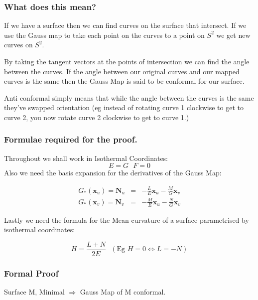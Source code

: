 \subsubsection{What does this mean?}
If we have a surface then we can find curves on the surface that intersect. If we use the Gauss map to take each point on the curves to a point on $S^2$ we get new curves on $S^2$.

By taking the tangent vectors at the points of intersection we can find the angle between the curves. If the angle between our original curves and our mapped curves is the same then the Gauss Map is said to be conformal for our surface.

Anti conformal simply means that while the angle between the curves is the same they've swapped orientation (eg instead of rotating curve 1 clockwise to get to curve 2, you now rotate curve 2 clockwise to get to curve 1.)

\subsubsection{Formulae required for the proof.}
Throughout we shall work in Isothermal Coordinates:
\begin{displaymath}
E=G \mbox{\ \ \ \ } F=0
\end{displaymath}
Also we need the basis expansion for the derivatives of the Gauss Map:

\begin{eqnarray}
\nonumber
G_*(\mathbf x_u) = \mathbf N_u &=& -\frac{L}{E} \mathbf x_u - \frac{M}{G} \mathbf x_v \\
G_*(\mathbf x_v) = \mathbf N_v &=& -\frac{M}{E} \mathbf x_u - \frac{N}{G} \mathbf x_v
\label{GMBE}
\end{eqnarray}

Lastly we need the formula for the Mean curvature of a surface parametrised by isothermal coordinates:

\begin{displaymath}
H = \frac{L+N}{2E} \mbox{\ \ \ } \left(\mbox {Eg \ } H=0 \Leftrightarrow L=-N \right)
\end{displaymath}

\subsubsection{Formal Proof}

\begin{prop}
Surface M, Minimal $\Rightarrow$ Gauss Map of M conformal.
\end{prop}

